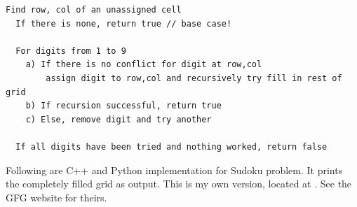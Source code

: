 \begin{lstlisting}[style=raygeneric]
Find row, col of an unassigned cell
  If there is none, return true // base case!
  
  For digits from 1 to 9
    a) If there is no conflict for digit at row,col
        assign digit to row,col and recursively try fill in rest of grid
    b) If recursion successful, return true
    c) Else, remove digit and try another
  
  If all digits have been tried and nothing worked, return false
\end{lstlisting}

Following are C++ and Python implementation for Sudoku problem. It prints
the completely filled grid as output. This is my own version, located at
. See the GFG website for
theirs.
